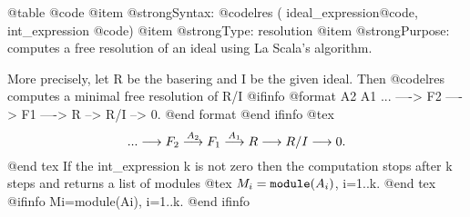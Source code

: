 {@table @code
@item @strong{Syntax:}
@code{lres (} ideal_expression@code{,} int_expression @code{)}
@item @strong{Type:}
resolution
@item @strong{Purpose:}
computes a free resolution of an ideal using La Scala's algorithm.

More precisely, let R be the basering and I be the given ideal.
Then @code{lres} computes a minimal free resolution of R/I
@ifinfo
@format
                    A2       A1
      ... ----> F2 ----> F1 ----> R --> R/I --> 0.
@end format
@end ifinfo
@tex
$$...\longrightarrow F_2 \buildrel{A_2}\over{\longrightarrow} F_1
\buildrel{A_1}\over{\longrightarrow} R\longrightarrow R/I
\longrightarrow 0.$$
@end tex
If the int_expression k is not zero then the computation stops after
k steps and returns a list of modules
@tex
$M_i={\tt module}(A_i)$, i=1..k.
@end tex
@ifinfo
Mi=module(Ai), i=1..k.
@end ifinfo

}
